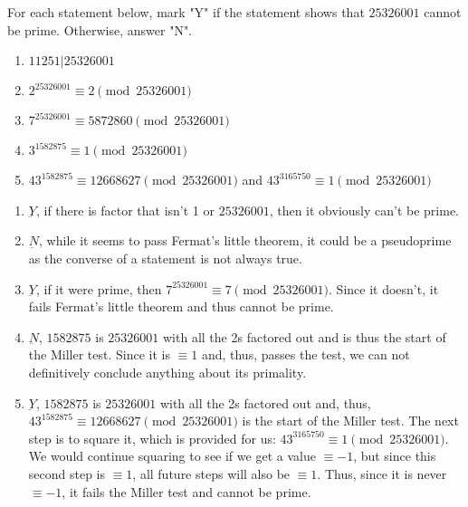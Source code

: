 \documentclass{article}
\begin{document}
\begin{problem}{}{}
    For each statement below, mark "Y" if the statement shows that $\num[group-separator={,}]{25326001}$ cannot be prime. Otherwise, answer "N".
    \begin{enumerate}[label=\textbf{(\alph*)}]
        \item $11251|25326001$
        \item $2^{25326001}\equiv2 \pmod{25326001}$
        \item $7^{25326001}\equiv5872860\pmod{25326001}$
        \item $3^{1582875}\equiv1\pmod{25326001}$
        \item $43^{1582875}\equiv12668627\pmod{25326001}$ and $43^{3165750}\equiv1\pmod{25326001}$
    \end{enumerate}
\end{problem}
\begin{solution}{}{}
    \begin{enumerate}[label=\textbf{(\alph*)}]
        \item $\underbar{Y}$, if there is factor that isn't 1 or $\num[group-separator={,}]{25326001}$, then it obviously can't be prime.
        \item $\underbar{N}$, while it seems to pass Fermat's little theorem, it could be a pseudoprime as the converse of a statement is not always true.
        \item $\underbar{Y}$, if it were prime, then $7^{25326001}\equiv7\pmod{25326001}$. Since it doesn't, it fails Fermat's little theorem and thus cannot be prime.
        \item $\underbar{N}$, $1582875$ is $25326001$ with all the 2s factored out and is thus the start of the Miller test. Since it is $\equiv1$ and, thus, passes the test, we can not definitively conclude anything about its primality.
        \item $\underbar{Y}$, $1582875$ is $25326001$ with all the 2s factored out and, thus, $43^{1582875}\equiv12668627\pmod{25326001}$ is the start of the Miller test. The next step is to square it, which is provided for us: $43^{3165750}\equiv1\pmod{25326001}$. We would continue squaring to see if we get a value $\equiv-1$, but since this second step is $\equiv1$, all future steps will also be $\equiv1$. Thus, since it is never $\equiv-1$, it fails the Miller test and cannot be prime.
    \end{enumerate}
\end{solution}
\end{document}
